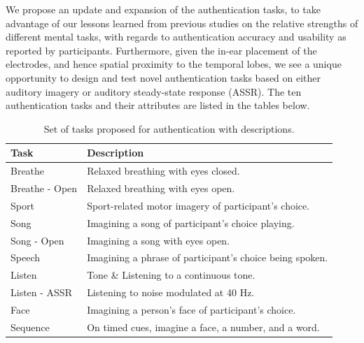 \documentclass[11pt]{article}
\begin{document}
We propose an update and expansion of the authentication tasks, to take
advantage of our lessons learned from previous studies on the relative strengths
of different mental tasks, with regards to authentication accuracy and usability as
reported by participants. Furthermore, given the in-ear placement of the
electrodes, and hence spatial proximity to the temporal lobes, we see a unique
opportunity to design and test novel authentication tasks based on either auditory
imagery or auditory steady-state response (ASSR). The ten authentication tasks and their
attributes are listed in the tables below.

\begin{table}[h]
\centering
\begin{tabular}{ll}
\textbf{\textbf{Task}} & \textbf{\textbf{Description}}\\
\hline
Breathe & Relaxed breathing with eyes closed.\\
Breathe - Open & Relaxed breathing with eyes open.\\
Sport & Sport-related motor imagery of participant's choice.\\
Song & Imagining a song of participant's choice playing.\\
Song - Open & Imagining a song with eyes open.\\
Speech & Imagining a phrase of participant's choice being spoken.\\
Listen & Tone \& Listening to a continuous tone.\\
Listen - ASSR & Listening to noise modulated at 40 Hz.\\
Face & Imagining a person's face of participant's choice.\\
Sequence & On timed cues, imagine a face, a number, and a word.\\
\hline
\end{tabular}
\caption{Set of tasks proposed for authentication with descriptions.}
\end{table}
\end{document}
